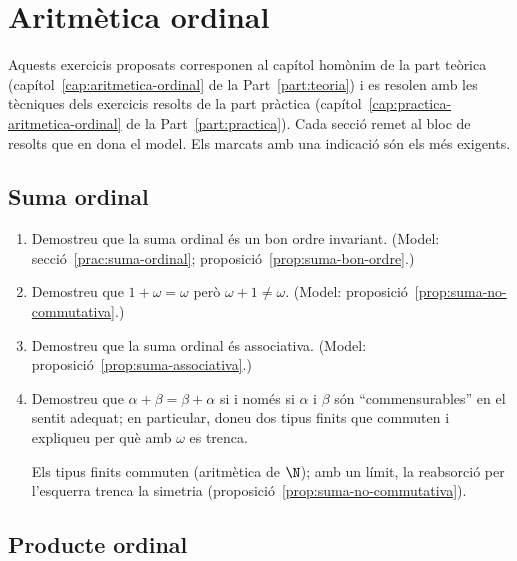 \chapter{Aritmètica ordinal}\label{cap:exercicis-aritmetica-ordinal}

Aquests exercicis proposats corresponen al capítol homònim de la part teòrica (capítol~\ref{cap:aritmetica-ordinal} de la Part~\ref{part:teoria}) i es resolen amb les tècniques dels exercicis resolts de la part pràctica (capítol~\ref{cap:practica-aritmetica-ordinal} de la Part~\ref{part:practica}). Cada secció remet al bloc de resolts que en dona el model. Els marcats amb una indicació són els més exigents.

\section{Suma ordinal}

\begin{enumerate}
  \item Demostreu que la suma ordinal és un bon ordre invariant. (Model: secció~\ref{prac:suma-ordinal}; proposició~\ref{prop:suma-bon-ordre}.)

  \item Demostreu que \(1+\omega=\omega\) però \(\omega+1\neq\omega\). (Model: proposició~\ref{prop:suma-no-commutativa}.)

  \item Demostreu que la suma ordinal és associativa. (Model: proposició~\ref{prop:suma-associativa}.)

  \item Demostreu que \(\alpha+\beta=\beta+\alpha\) si i només si \(\alpha\) i \(\beta\) són \enquote{commensurables} en el sentit adequat; en particular, doneu dos tipus finits que commuten i expliqueu per què amb \(\omega\) es trenca. \begin{indicacio}Els tipus finits commuten (aritmètica de \(\N\)); amb un límit, la reabsorció per l'esquerra trenca la simetria (proposició~\ref{prop:suma-no-commutativa}).\end{indicacio}
\end{enumerate}

\section{Producte ordinal}

